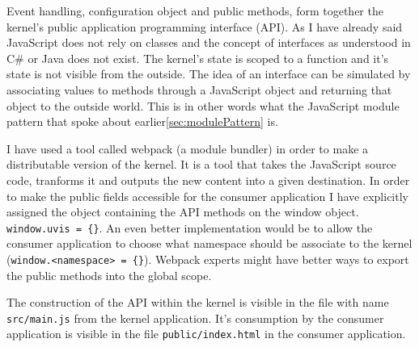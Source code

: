 Event handling, configuration object and public methods, form together the kernel's public application programming interface (API). As I have already said JavaScript does not rely on classes and the concept of interfaces as understood in C\# or Java does not exist. The kernel's state is scoped to a function and it's state is not visible from the outside. The idea of an interface can be simulated by associating values to methods through a JavaScript object and returning that object to the outside world. This is in other words what the JavaScript module pattern that spoke about earlier\ref{sec:modulePattern} is. 

I have used a tool called webpack (a module bundler) in order to make a distributable version of the kernel. It is a tool that takes the JavaScript source code, tranforms it and outputs the new content into a given destination. In order to make the public fields accessible for the consumer application I have explicitly assigned the object containing the API methods on the window object. \texttt{window.uvis = \{\}}. An even better implementation would be to allow the consumer application to choose what namespace should be associate to the kernel (\texttt{window.<namespace> = \{\}}). Webpack experts might have better ways to export the public methods into the global scope.

The construction of the API within the kernel is visible in the file with name \texttt{src/main.js} from the kernel application. It's consumption by the consumer application is visible in the file \texttt{public/index.html} in the consumer application.